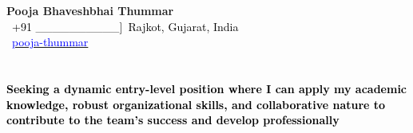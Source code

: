 \documentclass[a4paper,10pt]{article}
\begin{document}
\pagestyle{empty}

\begin{center}
    {\Huge \textbf{Pooja Bhaveshbhai Thummar}}\\
    \vspace{2mm}
    \textcolor{black}{\ +91 __________]\ Rajkot, Gujarat, India} \\
    \textcolor{black}{\faLinkedinIn\ \href{https://www.linkedin.com/in/pooja-thummar-b903a2289}{\textcolor{blue}{pooja-thummar}}}
\end{center}

\section*{}
\textcolor{black}{\textbf{Seeking a dynamic entry-level position where I can apply my academic knowledge, robust organizational skills, and collaborative nature to contribute to the team's success and develop professionally}}
\end{document}
